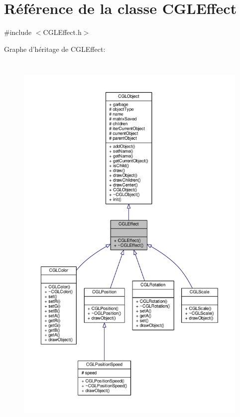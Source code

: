 \hypertarget{class_c_g_l_effect}{\section{Référence de la classe C\-G\-L\-Effect}
\label{class_c_g_l_effect}
}


{\ttfamily \#include $<$C\-G\-L\-Effect.\-h$>$}



Graphe d'héritage de C\-G\-L\-Effect\-:
\nopagebreak
\begin{figure}[H]
\begin{center}
\leavevmode
\includegraphics[height=550pt]{d7/d88/class_c_g_l_effect__inherit__graph}
\end{center}
\end{figure}



